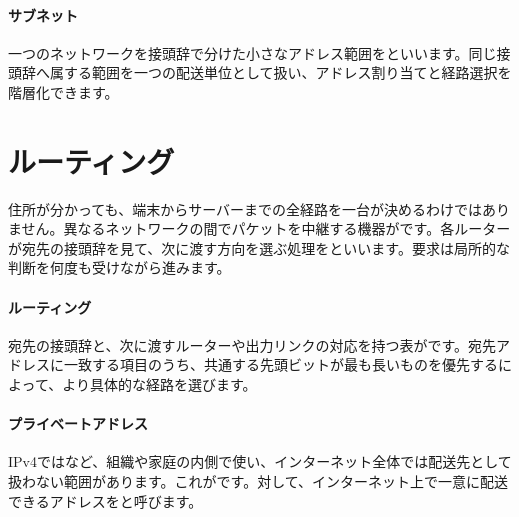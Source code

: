 \paragraph{サブネット}
        一つのネットワークを接頭辞で分けた小さなアドレス範囲をといいます。同じ接頭辞へ属する範囲を一つの配送単位として扱い、アドレス割り当てと経路選択を階層化できます。

\par
\endgroup
\par
\endgroup


\section{ルーティング}
\label{sec:05-network-07}

住所が分かっても、端末からサーバーまでの全経路を一台が決めるわけではありません。異なるネットワークの間でパケットを中継する機器がです。各ルーターが宛先の接頭辞を見て、次に渡す方向を選ぶ処理をといいます。要求は局所的な判断を何度も受けながら進みます。

\begingroup
\begingroup
      \centering
      \vspace{5mm}
\paragraph{ルーティング}
        宛先の接頭辞と、次に渡すルーターや出力リンクの対応を持つ表がです。宛先アドレスに一致する項目のうち、共通する先頭ビットが最も長いものを優先するによって、より具体的な経路を選びます。

\par
\endgroup
\medskip
\begingroup
\paragraph{プライベートアドレス}
        IPv4ではなど、組織や家庭の内側で使い、インターネット全体では配送先として扱わない範囲があります。これがです。対して、インターネット上で一意に配送できるアドレスをと呼びます。


